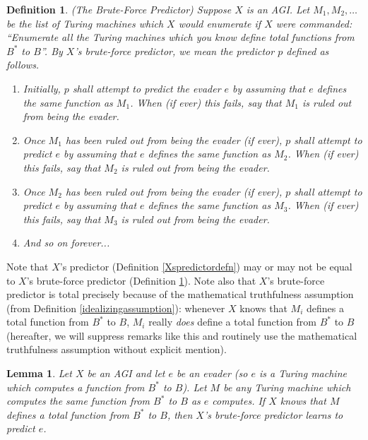 \documentclass{article}
\newtheorem{definition}[theorem]{Definition}
\newtheorem{lemma}[theorem]{Lemma}
\begin{document}
\begin{definition}
\label{bruteforcepredictordefn}
    (The Brute-Force Predictor)
    Suppose $X$ is an AGI. Let $M_1,M_2,\ldots$ be the list of Turing machines
    which $X$ would enumerate if $X$ were commanded: ``Enumerate all the Turing
    machines which you know define total functions from $B^*$ to $B$''.
    By \emph{$X$'s brute-force predictor}, we mean the predictor $p$ defined
    as follows.
    \begin{enumerate}
        \item
        Initially, $p$ shall attempt to predict the evader $e$ by assuming that $e$
        defines the same function as $M_1$. When (if ever) this fails,
        say that \emph{$M_1$ is ruled out from being the evader}.
        \item
        Once $M_1$ has been ruled out from being the evader (if ever),
        $p$ shall attempt to predict $e$ by assuming that $e$ defines the same
        function as $M_2$. When (if ever) this fails,
        say that \emph{$M_2$ is ruled out from being the evader}.
        \item
        Once $M_2$ has been ruled out from being the evader (if ever),
        $p$ shall attempt to predict $e$ by assuming that $e$ defines the same
        function as $M_3$. When (if ever) this fails,
        say that \emph{$M_3$ is ruled out from being the evader}.
        \item
        And so on forever...
    \end{enumerate}
\end{definition}

Note that $X$'s predictor (Definition \ref{Xspredictordefn})
may or may not be equal to $X$'s brute-force predictor
(Definition \ref{bruteforcepredictordefn}). Note also that $X$'s brute-force predictor
is total precisely because of the mathematical truthfulness assumption
(from Definition \ref{idealizingassumption}): whenever $X$ knows that
$M_i$ defines a total function from $B^*$ to $B$, $M_i$ really \emph{does}
define a total function from $B^*$ to $B$ (hereafter, we will suppress
remarks like this and routinely use the mathematical truthfulness assumption
without explicit mention).

\begin{lemma}
\label{knowingimplieslearninglemma}
    Let $X$ be an AGI and let $e$ be an evader (so $e$ is a Turing machine which
    computes a function from $B^*$ to $B$).
    Let $M$ be any Turing machine which computes the same function from $B^*$ to $B$
    as $e$ computes.
    If $X$ knows that $M$ defines a total function from $B^*$ to $B$,
    then $X$'s brute-force predictor learns to predict $e$.
\end{lemma}
\end{document}
